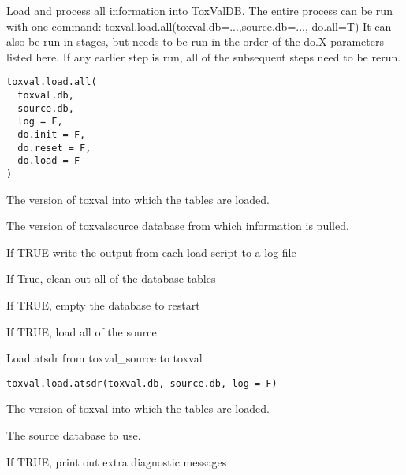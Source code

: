 \documentclass[letterpaper]{book}
\begin{document}
%
\begin{Description}\relax
Load and process all information into ToxValDB. The entire process can be run with
one command: toxval.load.all(toxval.db=...,source.db=..., do.all=T)
It can also be run in stages, but needs to be run in the order of the do.X parameters
listed here. If any earlier step is run, all of the subsequent steps need to be rerun.
\end{Description}
%
\begin{Usage}
\begin{verbatim}
toxval.load.all(
  toxval.db,
  source.db,
  log = F,
  do.init = F,
  do.reset = F,
  do.load = F
)
\end{verbatim}
\end{Usage}
%
\begin{Arguments}
\begin{ldescription}
\item[\code{toxval.db}] The version of toxval into which the tables are loaded.

\item[\code{source.db}] The version of toxvalsource database from which information is pulled.

\item[\code{log}] If TRUE write the output from each load script to a log file

\item[\code{do.init}] If True, clean out all of the database tables

\item[\code{do.reset}] If TRUE, empty the database to restart

\item[\code{do.load}] If TRUE, load all of the source
\end{ldescription}
\end{Arguments}
%
\begin{Description}\relax
Load atsdr from toxval\_source to toxval
\end{Description}
%
\begin{Usage}
\begin{verbatim}
toxval.load.atsdr(toxval.db, source.db, log = F)
\end{verbatim}
\end{Usage}
%
\begin{Arguments}
\begin{ldescription}
\item[\code{toxval.db}] The version of toxval into which the tables are loaded.

\item[\code{source.db}] The source database to use.

\item[\code{verbose}] If TRUE, print out extra diagnostic messages
\end{ldescription}
\end{Arguments}
\end{document}
